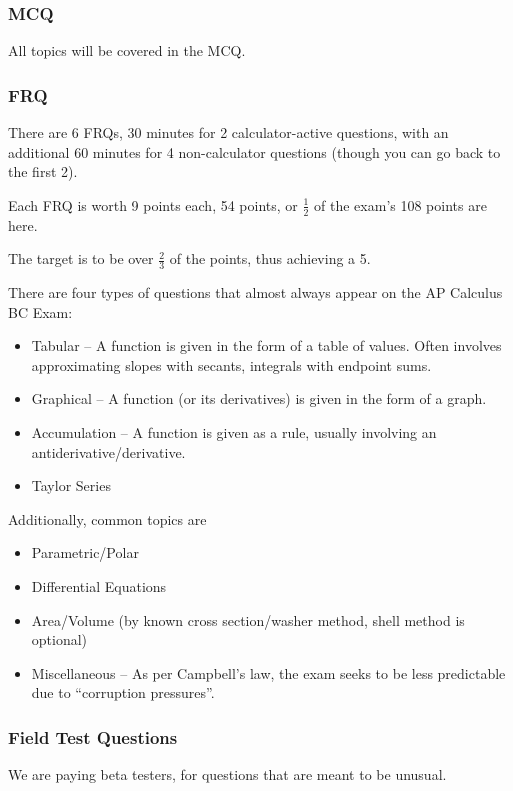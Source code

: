 \documentclass{article}
\begin{document}
\subsubsection{MCQ}
All topics will be covered in the MCQ.

\subsubsection{FRQ}
There are 6 FRQs, 30 minutes for 2 calculator-active questions, with an additional 60 minutes for 4 non-calculator questions (though you can go back to the first 2).

Each FRQ is worth 9 points each, 54 points, or $\frac{1}{2}$ of the exam's 108 points are here.

The target is to be over $\frac{2}{3}$ of the points, thus achieving a 5.

There are four types of questions that almost always appear on the AP Calculus BC Exam:
\begin{itemize}
    \item Tabular -- A function is given in the form of a table of values. Often involves approximating slopes with secants, integrals with endpoint sums.
    \item Graphical -- A function (or its derivatives) is given in the form of a graph.
    \item Accumulation -- A function is given as a rule, usually involving an antiderivative/derivative.
    \item Taylor Series
\end{itemize}

Additionally, common topics are
\begin{itemize}
    \item Parametric/Polar
    \item Differential Equations
    \item Area/Volume (by known cross section/washer method, shell method is optional)
    \item Miscellaneous -- As per Campbell's law, the exam seeks to be less predictable due to ``corruption pressures''.
\end{itemize}

\subsubsection{Field Test Questions}
We are paying beta testers, for questions that are meant to be unusual.
\end{document}
